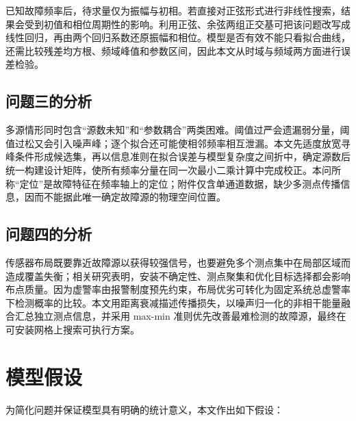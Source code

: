 \documentclass[withoutpreface,bwprint]{cumcmthesis}
\begin{document}
已知故障频率后，待求量仅为振幅与初相。若直接对正弦形式进行非线性搜索，结果会受到初值和相位周期性的影响。利用正弦、余弦两组正交基可把该问题改写成线性回归，再由两个回归系数还原振幅和相位。模型是否有效不能只看拟合曲线，还需比较残差均方根、频域峰值和参数区间，因此本文从时域与频域两方面进行误差检验。

\subsection{问题三的分析}

多源情形同时包含“源数未知”和“参数耦合”两类困难。阈值过严会遗漏弱分量，阈值过松又会引入噪声峰；逐个拟合还可能使相邻频率相互泄漏。本文先适度放宽寻峰条件形成候选集，再以信息准则在拟合误差与模型复杂度之间折中，确定源数后统一构建设计矩阵，使所有频率分量在同一次最小二乘计算中完成校正。本问所称“定位”是故障特征在频率轴上的定位；附件仅含单通道数据，缺少多测点传播信息，因而不能据此唯一确定故障源的物理空间位置。

\subsection{问题四的分析}

传感器布局既要靠近故障源以获得较强信号，也要避免多个测点集中在局部区域而造成覆盖失衡；相关研究表明，安装不确定性、测点聚集和优化目标选择都会影响布点质量\cite{an2022,hassani2023}。因为虚警率由报警制度预先约束，布局优劣可转化为固定系统总虚警率下检测概率的比较。本文用距离衰减描述传播损失，以噪声归一化的非相干能量融合汇总独立测点信息\cite{xiao2025}，并采用 max-min 准则优先改善最难检测的故障源，最终在可安装网格上搜索可执行方案\cite{deepseek2025}。

\section{模型假设}

为简化问题并保证模型具有明确的统计意义，本文作出如下假设：
\end{document}

